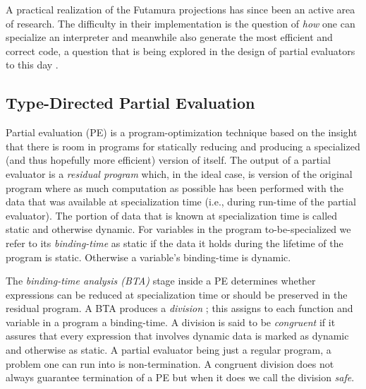 \documentclass[a4paper,12pt,twoside,openright]{report}
\theoremstyle{definition}
\begin{document}
A practical realization of the Futamura projections has since been an active area of research. The difficulty in their implementation is the question of \textit{how} one can specialize an interpreter and meanwhile also generate the most efficient and correct code, a question that is being explored in the design of partial evaluators to this day \cite{jones1988challenging,jones1993partial}.

\subsection{Type-Directed Partial Evaluation}
Partial evaluation (PE) is a program-optimization technique based on the insight that there is room in programs for statically reducing and producing a specialized (and thus hopefully more efficient) version of itself. The output of a partial evaluator is a \textit{residual program} which, in the ideal case, is version of the original program where as much computation as possible has been performed with the data that was available at specialization time (i.e., during run-time of the partial evaluator). The portion of data that is known at specialization time is called static and otherwise dynamic. For variables in the program to-be-specialized we refer to its \textit{binding-time} as static if the data it holds during the lifetime of the program is static. Otherwise a variable's binding-time is dynamic.

The \textit{binding-time analysis (BTA)} stage inside a PE determines whether expressions can be reduced at specialization time or should be preserved in the residual program. A BTA produces a \textit{division} \cite{jones1993partial}; this assigns to each function and variable in a program a binding-time. A division is said to be \textit{congruent} if it assures that every expression that involves dynamic data is marked as dynamic and otherwise as static. A partial evaluator being just a regular program, a problem one can run into is non-termination. A congruent division does not always guarantee termination of a PE but when it does we call the division \textit{safe}.

\end{document}
